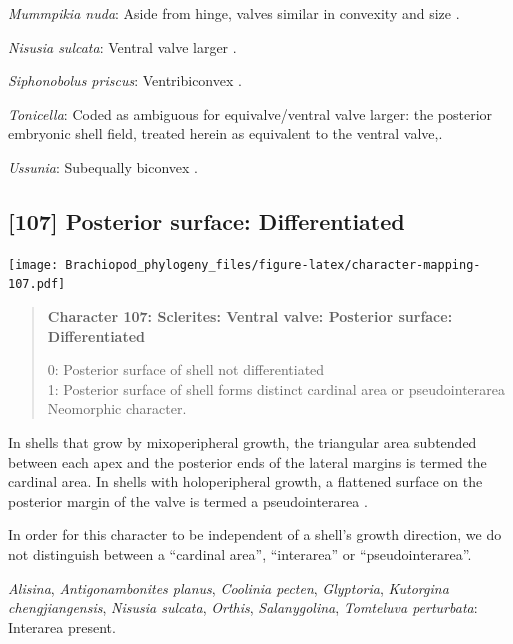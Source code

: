 \documentclass[openany]{book}
\begin{document}
\hypertarget{Mummpikia_nuda-coding-106}{}
\emph{Mummpikia nuda}: Aside from hinge, valves similar in convexity and
size \citep{Balthasar2008iMummpikia}.

\hypertarget{Nisusia_sulcata-coding-106}{}
\emph{Nisusia sulcata}: Ventral valve larger \citep[see][fig.
126.]{Williams2000LinguliformeaCraniiformea}.

\hypertarget{Siphonobolus_priscus-coding-106}{}
\emph{Siphonobolus priscus}: Ventribiconvex
\citep{Popov2009Earlyontogeny}.

\hypertarget{Tonicella-coding-106}{}
\emph{Tonicella}: Coded as ambiguous for equivalve/ventral valve larger:
the posterior embryonic shell field, treated herein as equivalent to the
ventral valve,.

\hypertarget{Ussunia-coding-106}{}
\emph{Ussunia}: Subequally biconvex
\citep[p.~192]{Williams2000LinguliformeaCraniiformea}.

\subsection*{{[}107{]} Posterior surface:
Differentiated}\label{posterior-surface-differentiated-1}

\texttt{[image: Brachiopod\_phylogeny\_files/figure-latex/character-mapping-107.pdf]}

\begin{quote}
\textbf{Character 107: Sclerites: Ventral valve: Posterior surface:
Differentiated}

0: Posterior surface of shell not differentiated\\
1: Posterior surface of shell forms distinct cardinal area or
pseudointerarea\\
Neomorphic character.
\end{quote}

In shells that grow by mixoperipheral growth, the triangular area
subtended between each apex and the posterior ends of the lateral
margins is termed the cardinal area. In shells with holoperipheral
growth, a flattened surface on the posterior margin of the valve is
termed a pseudointerarea
\citep[paraphrasing][]{Williams1997Introduction}.

In order for this character to be independent of a shell's growth
direction, we do not distinguish between a ``cardinal area'',
``interarea'' or ``pseudointerarea''.

\hypertarget{Alisina-coding-107}{}
\emph{Alisina}, \emph{Antigonambonites planus}, \emph{Coolinia pecten},
\emph{Glyptoria}, \emph{Kutorgina chengjiangensis}, \emph{Nisusia
sulcata}, \emph{Orthis}, \emph{Salanygolina}, \emph{Tomteluva
perturbata}: Interarea present.
\end{document}
